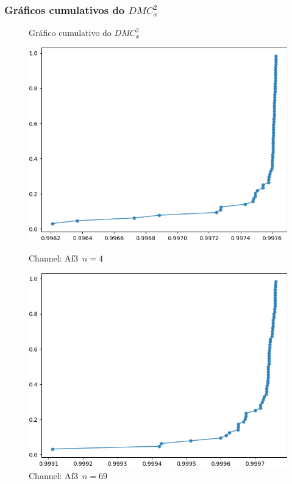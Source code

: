 \documentclass[11pt, aspectratio=169]{beamer}
\newcommand{\dmc}{\(DMC_x^2\) }
\begin{document}
\begin{frame}

  \frametitle{Gráficos cumulativos do \dmc}
\begin{figure}[ht]
  \caption{Gráfico cumulativo do \dmc}
  \begin{minipage}[b]{0.45\textwidth}
    \includegraphics[width=\textwidth]{../Figures/test_dmc/pdcca_of_Af3._n_4.png}
    \caption{Channel: Af3~$n = 4$}
  \end{minipage}
  \hfill
  \begin{minipage}[b]{0.45\textwidth}
    \includegraphics[width=\textwidth]{../Figures/test_dmc/pdcca_of_Af3._n_69.png}
    \caption{Channel: Af3~$n = 69$}
  \end{minipage}
\end{figure}
\end{frame}
\end{document}
